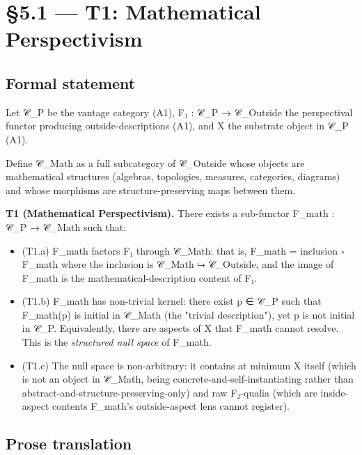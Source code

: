 \documentclass[11pt, openany]{book}
\newcommand{\sectionbreak}{\clearpage}
\begin{document}
\sectionbreak

\section{§5.1 --- T1: Mathematical Perspectivism}

\subsection{Formal statement}

Let 𝒞\_\allowbreak{}P be the vantage category (A1), F₁ : 𝒞\_\allowbreak{}P → 𝒞\_\allowbreak{}Outside the perspectival functor producing outside-descriptions (A1), and X the substrate object in 𝒞\_\allowbreak{}P (A1).

Define 𝒞\_\allowbreak{}Math as a full subcategory of 𝒞\_\allowbreak{}Outside whose objects are mathematical structures (algebras, topologies, measures, categories, diagrams) and whose morphisms are structure-preserving maps between them.

\textbf{T1 (Mathematical Perspectivism).} There exists a sub-functor F\_\allowbreak{}math : 𝒞\_\allowbreak{}P → 𝒞\_\allowbreak{}Math such that:

\begin{itemize}
\item (T1.a) F\_\allowbreak{}math factors F₁ through 𝒞\_\allowbreak{}Math: that is, F\_\allowbreak{}math = inclusion ∘ F\_\allowbreak{}math where the inclusion is 𝒞\_\allowbreak{}Math ↪ 𝒞\_\allowbreak{}Outside, and the image of F\_\allowbreak{}math is the mathematical-description content of F₁.
\item (T1.b) F\_\allowbreak{}math has non-trivial kernel: there exist p ∈ 𝒞\_\allowbreak{}P such that F\_\allowbreak{}math(p) is initial in 𝒞\_\allowbreak{}Math (the "trivial description"), yet p is not initial in 𝒞\_\allowbreak{}P. Equivalently, there are aspects of X that F\_\allowbreak{}math cannot resolve. This is the \textit{structured null space} of F\_\allowbreak{}math.
\item (T1.c) The null space is non-arbitrary: it contains at minimum X itself (which is not an object in 𝒞\_\allowbreak{}Math, being concrete-and-self-instantiating rather than abstract-and-structure-preserving-only) and raw F₂-qualia (which are inside-aspect contents F\_\allowbreak{}math's outside-aspect lens cannot register).
\end{itemize}

\subsection{Prose translation}
\end{document}
